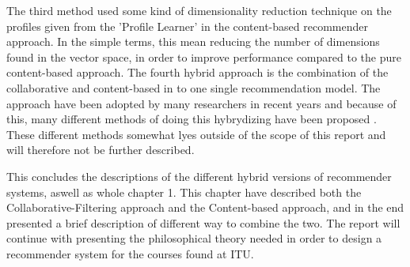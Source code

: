 The third method used some kind of dimensionality reduction technique on the profiles given from the 'Profile Learner' in the content-based recommender approach. In the simple terms, this mean reducing the number of dimensions found in the vector space, in order to improve performance compared to the pure content-based approach. \newline
The fourth hybrid approach is the combination of the collaborative and content-based in to one single recommendation model. The approach have been adopted by many researchers in recent years and because of this, many different methods of doing this hybrydizing have been proposed \citep[p. 22]{TowardsTheNextGenerationOfRs}. These different methods somewhat lyes outside of the scope of this report and will therefore not be further described. \newline


This concludes the descriptions of the different hybrid versions of recommender systems, aswell as whole chapter 1. This chapter have described both the Collaborative-Filtering approach and the Content-based approach, and in the end presented a brief description of different way to combine the two. The report will continue with presenting the philosophical theory needed in order to design a recommender system for the courses found at ITU.